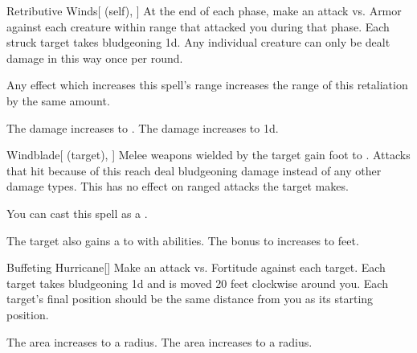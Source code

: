 \lowercase{\hypertarget{spell:Retributive Winds}{}}\label{spell:Retributive Winds}
\begin{attuneability}[Rank 3]{\hypertarget{spell:Retributive Winds}{Retributive Winds}}[ (self), ]
At the end of each phase, make an attack vs. Armor against each creature within \rngclose range that attacked you during that phase.
\hit Each struck target takes bludgeoning  \minus1d.
Any individual creature can only be dealt damage in this way once per round.

Any effect which increases this spell's range increases the range of this retaliation by the same amount.

\rankline
{} The damage increases to .
 The damage increases to  \plus1d.
\end{attuneability}
\vspace{0.25em}



\lowercase{\hypertarget{spell:Windblade}{}}\label{spell:Windblade}
\begin{attuneability}[Rank 3]{\hypertarget{spell:Windblade}{Windblade}}[ (target), ]
Melee weapons wielded by the target gain  foot  to .
Attacks that hit because of this reach deal bludgeoning damage instead of any other damage types.
This has no effect on ranged attacks the target makes.

You can cast this spell as a .

\rankline
{} The target also gains a   to  with  abilities.
 The bonus to  increases to  feet.
\end{attuneability}
\vspace{0.25em}



\lowercase{\hypertarget{spell:Buffeting Hurricane}{}}\label{spell:Buffeting Hurricane}
\begin{freeability}[Rank 4]{\hypertarget{spell:Buffeting Hurricane}{Buffeting Hurricane}}[]
Make an attack vs. Fortitude against each target.
\hit Each target takes bludgeoning  \minus1d and is moved 20 feet clockwise around you.
Each target's final position should be the same distance from you as its starting position.

\rankline
{} The area increases to a \arealarge radius.
 The area increases to a \areahuge radius.
\end{freeability}
\vspace{0.25em}



